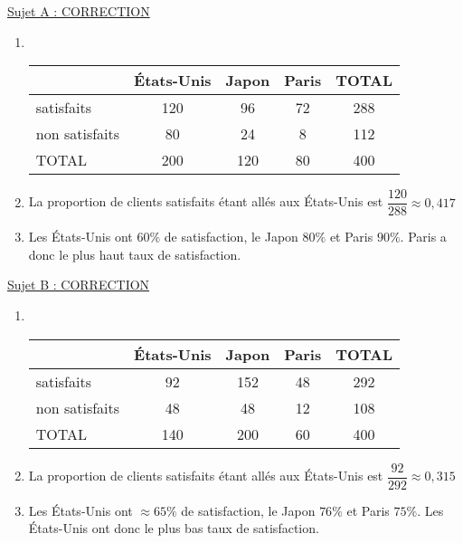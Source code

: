 \documentclass{beamer}
\begin{document}
\begin{frame}
	\small\color{red}
	\uline{Sujet A : CORRECTION}

	\begin{enumerate}
		\item \

		      \begin{tabular}{|l|c|c|c|c|}
			      \hline
			                     & États-Unis & Japon & Paris & TOTAL \\ \hline
			      satisfaits     & 120        & 96    & 72    & 288   \\ \hline
			      non satisfaits & 80         & 24    & 8     & 112   \\ \hline
			      TOTAL          & 200        & 120   & 80    & 400   \\ \hline
		      \end{tabular}
		\item La proportion de clients satisfaits étant allés aux États-Unis est $\dfrac{120}{288} ≈ 0,417$
		\item Les États-Unis ont $60\%$ de satisfaction, le Japon $80\%$ et Paris $90\%$. Paris a donc le plus haut taux de satisfaction.
	\end{enumerate}
\end{frame}

\begin{frame}
	\small\color{red}
	\uline{Sujet B : CORRECTION}

	\begin{enumerate}
		\item \

		      \begin{tabular}{|l|c|c|c|c|}
			      \hline
			                     & États-Unis & Japon & Paris & TOTAL \\ \hline
			      satisfaits     & 92         & 152   & 48    & 292   \\ \hline
			      non satisfaits & 48         & 48    & 12    & 108   \\ \hline
			      TOTAL          & 140        & 200   & 60    & 400   \\ \hline
		      \end{tabular}
		\item La proportion de clients satisfaits étant allés aux États-Unis est $\dfrac{92}{292} ≈ 0,315$
		\item Les États-Unis ont $≈65\%$ de satisfaction, le Japon $76\%$ et Paris $75\%$. Les États-Unis ont donc le plus bas taux de satisfaction.
	\end{enumerate}
\end{frame}
\end{document}

